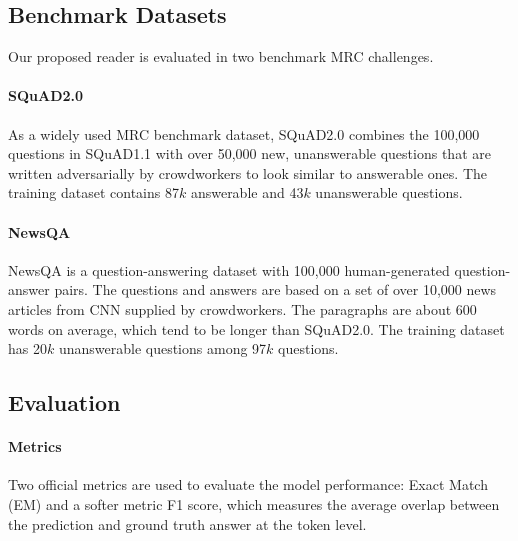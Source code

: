 \documentclass[letterpaper]{article} %
\begin{document}
\subsection{Benchmark Datasets}
Our proposed reader is evaluated in two benchmark MRC challenges.
\paragraph{SQuAD2.0}
As a widely used MRC benchmark dataset,
SQuAD2.0  \cite{Rajpurkar2018Know} combines the 100,000 questions in SQuAD1.1 \cite{Rajpurkar2016SQuAD} with over 50,000 new, unanswerable questions that are written adversarially by crowdworkers to look similar to answerable ones.
The training dataset contains 87$k$ answerable and 43$k$ unanswerable questions.

\paragraph{NewsQA}
NewsQA
\cite{trischler2017newsqa} %
is a question-answering dataset with 100,000 human-generated question-answer pairs. The questions and answers are based on a set of over 10,000 news articles from CNN supplied by crowdworkers. The paragraphs are about 600 words on average, which tend to be longer than SQuAD2.0. The training dataset has
20$k$ unanswerable questions among 97$k$ questions.







\subsection{Evaluation}

\paragraph{Metrics} Two official metrics are used to evaluate the model performance: Exact Match (EM) and a softer metric F1 score, which measures the average overlap between the prediction and ground truth answer at the token level.
\end{document}
